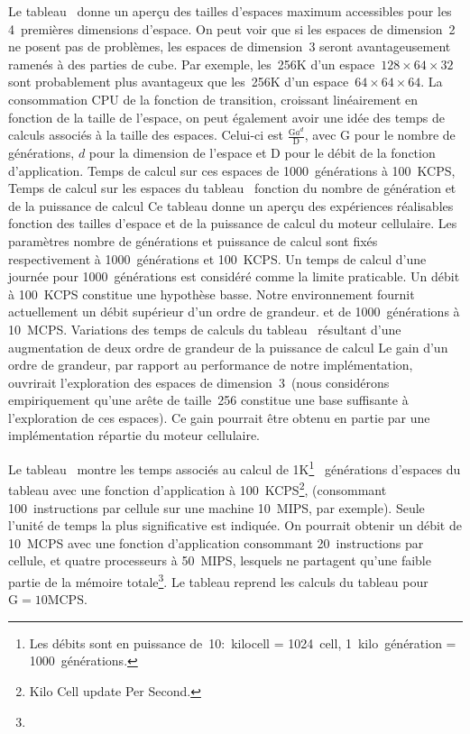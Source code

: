 Le tableau~ donne un aper\c{c}u des tailles d'espaces
maximum accessibles pour les 4~premi\`eres dimensions d'espace. %
On peut voir que si les espaces de dimension~2 ne posent pas de
probl\`emes, les espaces de dimension~3 seront avantageusement ramen\'es \`a
des parties de cube. %
Par exemple, les~256K d'un espace~$128 \times  64 \times  32$ sont probablement
plus avantageux que les~256K d'un espace~$64 \times  64 \times  64$. %
La consommation CPU de la fonction de transition, croissant
lin\'eairement en fonction de la taille de l'espace, on peut \'egalement
avoir une id\'ee des temps de calculs associ\'es \`a la taille des espaces. %
Celui-ci est $\frac{\text{G} a^{d}}{\text{D}}$, avec $\text{G}$ pour
le nombre de g\'en\'erations, $d$ pour la dimension de l'espace et
$\text{D}$ pour le d\'ebit de la fonction d'application.
%
{Temps de calcul sur ces espaces de 1000~g\'en\'erations \`a 100~KCPS,}%
{Temps de calcul sur les espaces du tableau~
  fonction du nombre de g\'en\'eration et de la puissance de calcul}%
{Ce tableau donne un aper\c{c}u des exp\'eriences r\'ealisables fonction des
  tailles d'espace et de la puissance de calcul du moteur cellulaire. %
  Les param\`etres nombre de g\'en\'erations et puissance de calcul sont
  fix\'es respectivement \`a 1000~g\'en\'erations et 100~KCPS\@. %
  Un temps de calcul d'une journ\'ee pour 1000~g\'en\'erations est consid\'er\'e
  comme la limite praticable. %
  Un d\'ebit \`a 100~KCPS constitue une hypoth\`ese basse. %
  Notre environnement fournit actuellement un d\'ebit sup\'erieur d'un
  ordre de grandeur.}
%
{et de 1000~g\'en\'erations \`a 10~MCPS.}%
{Variations des temps de calculs du
  tableau~ r\'esultant d'une augmentation
  de deux ordre de grandeur de la puissance de calcul}%
{Le gain d'un ordre de grandeur, par rapport au performance de notre
  impl\'ementation, ouvrirait l'exploration des espaces de
  dimension~3~(nous consid\'erons empiriquement qu'une ar\^ete de
  taille~256 constitue une base suffisante \`a l'exploration de ces
  espaces). %
  Ce gain pourrait \^etre obtenu en partie par une
  impl\'ementation r\'epartie du moteur cellulaire.}

Le tableau~ montre les temps associ\'es
au calcul de 1K\footnote{%
  Les d\'ebits sont en puissance
  de~10:\hfil{}~kilocell = 1024~cell, %
  1~kilo~g\'en\'eration = 1000~g\'en\'erations.}%
~g\'en\'erations d'espaces du tableau  avec une
fonction d'application \`a 100~KCPS\footnote{%
  Kilo Cell update Per
  Second.}, (consommant 100~instructions par cellule sur une machine
10~MIPS, par exemple). %
Seule l'unit\'e de temps la plus significative est indiqu\'ee. %
On pourrait obtenir un d\'ebit de 10~MCPS avec une fonction
d'application consommant 20~instructions par cellule, et quatre
processeurs \`a 50~MIPS, lesquels ne partagent qu'une faible partie de
la m\'emoire totale\footnote{%
  }. %
Le tableau  reprend les calculs du
tableau  pour %
$\text{G} = 10 \text{MCPS}$.
\clearpage

